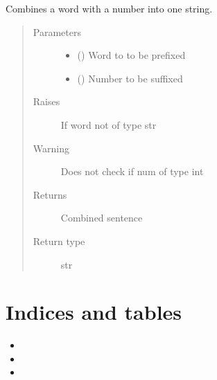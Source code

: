 \documentclass[letterpaper,10pt,english]{sphinxmanual}
\begin{document}
\begin{fulllineitems}
\label{\detokenize{index:project_folder.functions.adder}}
\sphinxAtStartPar
Combines a word with a number into one string.
\begin{quote}\begin{description}
\item[{Parameters}] \leavevmode\begin{itemize}
\item {} 
\sphinxAtStartPar
{} () \textendash{} Word to to be prefixed

\item {} 
\sphinxAtStartPar
{} () \textendash{} Number to be suffixed

\end{itemize}

\item[{Raises}] \leavevmode
\sphinxAtStartPar
{} \textendash{} If word not of type str

\item[{Warning}] \leavevmode
\sphinxAtStartPar
Does not check if num of type int

\item[{Returns}] \leavevmode
\sphinxAtStartPar
Combined sentence

\item[{Return type}] \leavevmode
\sphinxAtStartPar
str

\end{description}\end{quote}

\end{fulllineitems}



\chapter{Indices and tables}
\label{\detokenize{index:indices-and-tables}}\begin{itemize}
\item {} 
\sphinxAtStartPar
{}

\item {} 
\sphinxAtStartPar
{}

\item {} 
\sphinxAtStartPar
{}

\end{itemize}
\end{document}
